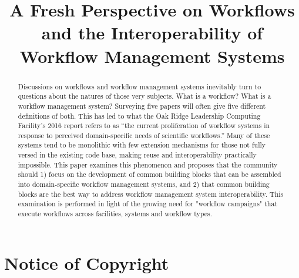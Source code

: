\documentclass[conference]{IEEEtran}
\begin{document}
\title{A Fresh Perspective on Workflows and the Interoperability of Workflow Management Systems}

\author{
\and
{}
}

\maketitle

\begin{abstract}

Discussions on workflows and workflow management systems inevitably turn to questions about the natures of those very subjects. What is a workflow? What is a workflow management system? Surveying five papers will often give five different definitions of both. This has led to what the Oak Ridge Leadership Computing Facility’s 2016 report refers to as “the current proliferation of workflow systems in response to perceived domain-specific needs of scientific workflows.” Many of these systems tend to be monolithic with few extension mechanisms for those not fully versed in the existing code base, making reuse and interoperability practically impossible. This paper examines this phenomenon and proposes that the community should 1) focus on the development of common building blocks that can be assembled into domain-specific workflow management systems, and 2) that common building blocks are the best way to address workflow management system interoperability. This examination is performed in light of the growing need for "workflow campaigns" that execute workflows across facilities, systems and workflow types.

\end{abstract}

\section{Notice of Copyright}\label{notice-of-copyright}
\end{document}
